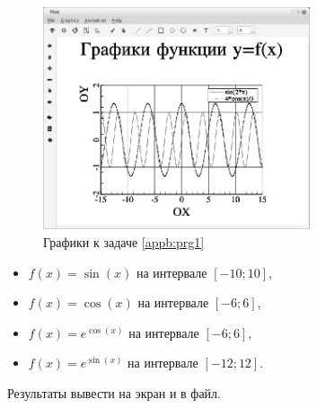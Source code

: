 \begin{figure}[htb]
\begin{center}
\includegraphics[width=0.7\textwidth]{img/ris_appb_3}
\caption{Графики к задаче \ref{appb:prg1}}
\label{appb:refDrawing2}
\end{center}
\end{figure}


\begin{itemize}
\item  $f(x)=\sin (x)$ на интервале $[-10;10]$, 
\item  $f(x)=\cos (x)$ на интервале $[-6;6]$, 
\item  $f(x)=e^{\cos (x)}$ на интервале $[-6;6]$,
\item  $f(x)=e^{\sin (x)}$ на интервале $[-12;12]$.
\end{itemize}
Результаты вывести на экран и в файл.


